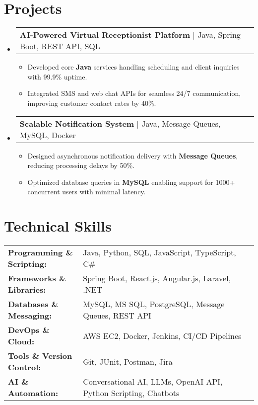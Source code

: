\documentclass[letterpaper,11pt]{article}
\makeatletter
\newcommand{\resumeItem}[1]{
  \item\footnotesize{
    {#1 \vspace{-2pt}}
  }
}
\newcommand{\resumeProjectHeading}[2]{
    \item
    \begin{tabular*}{1.001\textwidth}{l@{\extracolsep{\fill}}r}
      \small#1 & \textbf{\small #2}\\
    \end{tabular*}\vspace{-7pt}
}
\newcommand{\resumeSubHeadingListStart}{\begin{itemize}[leftmargin=0pt, label={}]}
\newcommand{\resumeSubHeadingListEnd}{\end{itemize}}
\newcommand{\resumeItemListStart}{\begin{itemize}[leftmargin=*]}
\newcommand{\resumeItemListEnd}{\end{itemize}\vspace{-5pt}}
\makeatother
\begin{document}
\section{Projects}
    \vspace{-5pt}
    \resumeSubHeadingListStart
      \resumeProjectHeading
          {\textbf{AI-Powered Virtual Receptionist Platform} | Java, Spring Boot, REST API, SQL}{}
          \resumeItemListStart
              \resumeItem{Developed core \textbf{Java} services handling scheduling and client inquiries with 99.9\% uptime.}
              \resumeItem{Integrated SMS and web chat APIs for seamless 24/7 communication, improving customer contact rates by 40\%.}
          \resumeItemListEnd
          \vspace{-16pt}
      \resumeProjectHeading
          {\textbf{Scalable Notification System} | Java, Message Queues, MySQL, Docker}{}
          \resumeItemListStart
              \resumeItem{Designed asynchronous notification delivery with \textbf{Message Queues}, reducing processing delays by 50\%.}
              \resumeItem{Optimized database queries in \textbf{MySQL} enabling support for 1000+ concurrent users with minimal latency.}
          \resumeItemListEnd
          \vspace{-16pt}
    \resumeSubHeadingListEnd
\vspace{-10pt}
\section{Technical Skills}
        \vspace{-14pt}
        \begin{table}[h]
            \footnotesize
            \begin{tabular}{p{0.3\linewidth} p{0.7\linewidth}}
                \textbf{Programming \& Scripting:} & Java, Python, SQL, JavaScript, TypeScript, C\# \\
                \textbf{Frameworks \& Libraries:} & Spring Boot, React.js, Angular.js, Laravel, .NET \\
                \textbf{Databases \& Messaging:} & MySQL, MS SQL, PostgreSQL, Message Queues, REST API \\
                \textbf{DevOps \& Cloud:} & AWS EC2, Docker, Jenkins, CI/CD Pipelines \\
                \textbf{Tools \& Version Control:} & Git, JUnit, Postman, Jira \\
                \textbf{AI \& Automation:} & Conversational AI, LLMs, OpenAI API, Python Scripting, Chatbots \\
            \end{tabular}
        \end{table}
\end{document}
